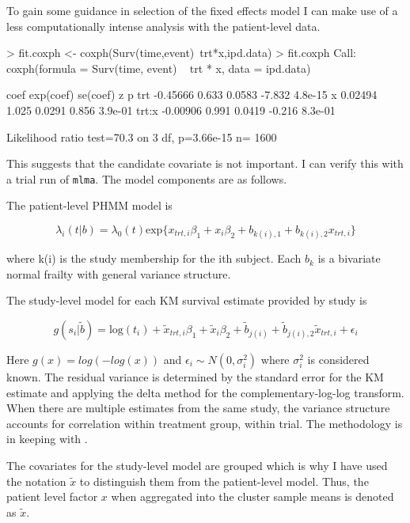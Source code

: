 To gain some guidance in selection of the fixed effects model I can
make use of a less computationally intense analysis with the patient-level data. 

\begin{Schunk}
\begin{Sinput}
> fit.coxph <- coxph(Surv(time,event)~trt*x,ipd.data)
> fit.coxph
Call:
coxph(formula = Surv(time, event) ~ trt * x, data = ipd.data)


          coef exp(coef) se(coef)      z       p
trt   -0.45666     0.633   0.0583 -7.832 4.8e-15
x      0.02494     1.025   0.0291  0.856 3.9e-01
trt:x -0.00906     0.991   0.0419 -0.216 8.3e-01

Likelihood ratio test=70.3  on 3 df, p=3.66e-15  n= 1600 
\end{Sinput}
\end{Schunk}

This suggests that the candidate covariate is not important. I can
verify this with a trial run of \texttt{mlma}. The model components are
as follows.

The patient-level PHMM model is

\[
\lambda_i(t|b) = \lambda_0(t) \mbox{exp}\lbrace x_{trt,i} \beta_1 +
x_i \beta_2 + b_{k(i),1} + b_{k(i),2} x_{trt,i} \rbrace
\]

\noindent where k(i) is the study membership for the ith subject. Each
$b_k$ is a bivariate normal frailty with general variance structure.

The study-level model for each KM survival estimate provided by study
is

\[
g(s_i|\tilde{b}) = \mbox{log}(t_i) + \tilde{x}_{trt,i} \beta_1 +
\tilde{x}_i \beta_2 + \tilde{b}_{j(i)}+\tilde{b}_{j(i),2} \tilde{x}_{trt,i} +\epsilon_i
\]

\noindent Here $g(x) = log(-log(x))$  and $\epsilon_i \sim
N(0,\sigma_i^2)$ where $\sigma_i^2$ is considered known. The residual
variance is determined by the standard error for the KM estimate and
applying the delta method for the complementary-log-log
transform. When there are multiple estimates from the same study, the
variance structure accounts for correlation within treatment group,
within trial. The methodology is in keeping with \cite{Arends2008a}.

The covariates for the study-level model are grouped which is why I
have used the notation $\tilde{x}$ to distinguish them from the
patient-level model. Thus, the patient level factor $x$ when
aggregated into the cluster sample means is denoted as $\tilde{x}$.

